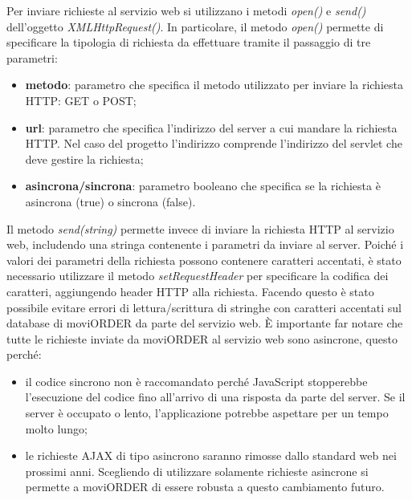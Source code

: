 Per inviare richieste al servizio web si utilizzano i metodi \textit{open()} e \textit{send()} dell'oggetto \textit{XMLHttpRequest()}. In particolare, il metodo \textit{open()} permette di specificare la tipologia di richiesta da effettuare tramite il passaggio di tre parametri:
	\begin{itemize}
		\item \textbf{metodo}: parametro che specifica il metodo utilizzato per inviare la richiesta HTTP: GET o POST;
		\item \textbf{url}: parametro che specifica l'indirizzo del server a cui mandare la richiesta HTTP. Nel caso del progetto l'indirizzo comprende l'indirizzo del servlet che deve gestire la richiesta;
		\item \textbf{asincrona/sincrona}: parametro booleano che specifica se la richiesta è asincrona (true) o sincrona (false).
	\end{itemize}
Il metodo \textit{send(string)} permette invece di inviare la richiesta HTTP al servizio web, includendo una stringa contenente i parametri da inviare al server. Poiché i valori dei parametri della richiesta possono contenere caratteri accentati, è stato necessario utilizzare il metodo \textit{setRequestHeader} per specificare la codifica dei caratteri, aggiungendo header HTTP alla richiesta. Facendo questo è stato possibile evitare errori di lettura/scrittura di stringhe con caratteri accentati sul database di moviORDER da parte del servizio web. È importante far notare che tutte le richieste inviate da moviORDER al servizio web sono asincrone, questo perché:
\begin{itemize}
	\item il codice sincrono non è raccomandato perché JavaScript stopperebbe l'esecuzione del codice fino all'arrivo di una risposta da parte del server. Se il server è occupato o lento, l'applicazione potrebbe aspettare per un tempo molto lungo;
	\item le richieste AJAX di tipo asincrono saranno rimosse dallo standard web nei prossimi anni. Scegliendo di utilizzare solamente richieste asincrone si permette a moviORDER di essere robusta a questo cambiamento futuro.
\end{itemize} 

